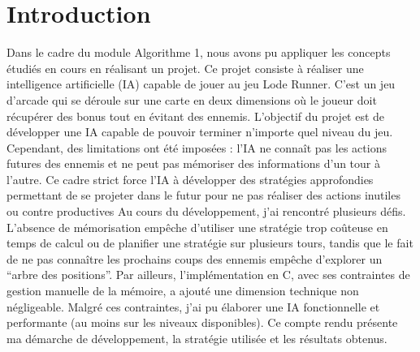 \chapter{Introduction}
\label{cp:introduction}
Dans le cadre du module Algorithme 1, nous avons pu appliquer les concepts étudiés en cours en réalisant un projet.
Ce projet consiste à réaliser une intelligence artificielle (IA) capable de jouer au jeu Lode Runner.
C'est un jeu d'arcade qui se déroule sur une carte en deux dimensions où le joueur doit récupérer des bonus tout en évitant des ennemis. 
\newline\newline
L'objectif du projet est de développer une IA capable de pouvoir terminer n'importe quel niveau du jeu.
Cependant, des limitations ont été imposées : l'IA ne connaît pas les actions futures des ennemis et ne peut pas mémoriser des informations d'un tour à l'autre.
Ce cadre strict force l'IA à développer des stratégies approfondies permettant de se projeter dans le futur pour ne pas réaliser des actions inutiles ou contre productives
\newline\newline
Au cours du développement, j'ai rencontré plusieurs défis.
L'absence de mémorisation empêche d'utiliser une stratégie trop coûteuse en temps de calcul ou de planifier une stratégie sur plusieurs tours, tandis que le fait de ne pas connaître les prochains coups des ennemis empêche d'explorer un “arbre des positions”.
Par ailleurs, l'implémentation en C, avec ses contraintes de gestion manuelle de la mémoire, a ajouté une dimension technique non négligeable.
\newline\newline
Malgré ces contraintes, j'ai pu élaborer une IA fonctionnelle et performante (au moins sur les niveaux disponibles).
\newline\newline
Ce compte rendu présente ma démarche de développement, la stratégie utilisée et les résultats obtenus.